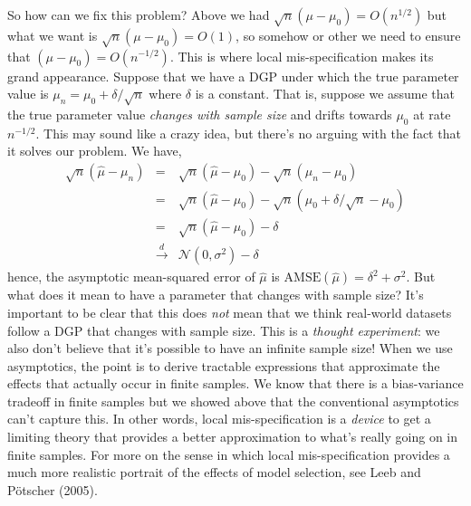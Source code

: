 So how can we fix this problem? Above we had $ \sqrt{n}\left(\mu - \mu_0\right) = O(n^{1/2})$ but what we want is $\sqrt{n}\left(\mu - \mu_0 \right) = O(1)$, so somehow or other we need to ensure that $\left(\mu - \mu_0 \right) = O(n^{-1/2})$. 
This is where local mis-specification makes its grand appearance. 
Suppose that we have a DGP under which the true parameter value is $\mu_n = \mu_0 + \delta/\sqrt{n}$ where $\delta$ is a constant. 
That is, suppose we assume that the true parameter value \emph{changes with sample size} and drifts towards $\mu_0$ at rate $n^{-1/2}$. 
This may sound like a crazy idea, but there's no arguing with the fact that it solves our problem. We have,
\begin{eqnarray*}
\sqrt{n}\left( \widehat{\mu} - \mu_n\right) &=& \sqrt{n}\left(\widehat{\mu} - \mu_0 \right) - \sqrt{n}\left(\mu_n - \mu_0 \right)\\
&=&\sqrt{n}\left(\widehat{\mu} - \mu_0 \right) - \sqrt{n}\left(\mu_0 + \delta/\sqrt{n} - \mu_0 \right)\\
&=& \sqrt{n}\left(\widehat{\mu} - \mu_0 \right) - \delta\\
&\overset{d}{\rightarrow}& \mathcal{N}(0, \sigma^2) - \delta
\end{eqnarray*}
hence, the asymptotic mean-squared error of $\widehat{\mu}$ is $\mbox{AMSE}(\widehat{\mu}) = \delta^2 + \sigma^2$. 
But what does it mean to have a parameter that changes with sample size? 
It's important to be clear that this does \emph{not} mean that we think real-world datasets follow a DGP that changes with sample size. 
This is a \emph{thought experiment}: we also don't believe that it's possible to have an infinite sample size! 
When we use asymptotics, the point is to derive tractable expressions that approximate the effects that actually occur in finite samples. 
We know that there is a bias-variance tradeoff in finite samples but we showed above that the conventional asymptotics can't capture this. 
In other words, local mis-specification is a \emph{device} to get a limiting theory that provides a better approximation to what's really going on in finite samples. 
For more on the sense in which local mis-specification provides a much more realistic portrait of the effects of model selection, see Leeb and P\"{o}tscher (2005).



